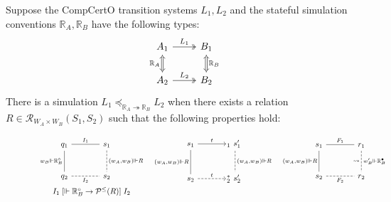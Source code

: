 \documentclass[acmsmall,screen,review,anonymous]{acmart}
\newcommand{\ifr}[1]{\mathrel{[{#1}]}}
\newcommand{\que}{\circ}
\newcommand{\ans}{\bullet}
\begin{document}
\begin{definition}
Suppose the CompCertO transition systems $L_1, L_2$
and the stateful simulation conventions $\mathbb{R}_A, \mathbb{R}_B$
have the following types:
\[
\begin{tikzcd}
  A_1 \ar[r, twoheadrightarrow, "L_1"] \ar[d, Leftrightarrow, "\mathbb{R}_A"'] &
  B_1 \ar[d, Leftrightarrow, "\mathbb{R}_B"] \\
  A_2 \ar[r, twoheadrightarrow, "L_2"] & B_2
\end{tikzcd}
\]
There is a simulation
$L_1 \preceq_{\mathbb{R}_A \twoheadrightarrow \mathbb{R}_B} L_2$
when there exists a relation $R \in \mathcal{R}_{W_A \times W_B}(S_1, S_2)$
such that the following properties hold:
\begin{figure}[h] %
  \[
    \begin{array}{c@{\quad}c@{\quad}c}
      \begin{tikzcd}[sep=large]
        q_1 \ar[d, "w_B \Vdash \mathbb{R}_B^\que"', dash] \ar[r, dash, "I_1"] &
        s_1 \ar[d, "{(w_A,w_B) \Vdash R}", dash, dashed] \\
        q_2 \ar[r, "I_2"', dash, dashed] &
        s_2
      \end{tikzcd}
      &
      \begin{tikzcd}[sep=large]
        s_1 \ar[r, "t"] \ar[d, "{(w_A, w_B) \Vdash R}"', dash] &
        \!\!{}_1 \:\, s_1' \ar[d, "{(w_A, w_B) \Vdash R}", dash, dashed] \\
        s_2 \ar[r, "t", dashed] &
        \!\!{}_2^* \:\, s_2'
      \end{tikzcd}
      &
      \begin{tikzcd}[sep=large]
        s_1 \ar[r, "F_1", dash] \ar[d, "{(w_A, w_B) \Vdash R}"', dash] &
        r_1 \ar[d, "\leadsto"', "w_B' \Vdash \mathbb{R}_B^\ans", dash, dashed] \\
        s_2 \ar[r, "F_2"', dash, dashed] &
        r_2
      \end{tikzcd}
      \vspace{0.5ex} \\
      I_1 \ifr{\Vdash \mathbb{R}_B^\que \rightarrow \mathcal{P}^\le(R)} I_2

\end{array}\]
\end{figure}
\end{definition}
\end{document}
